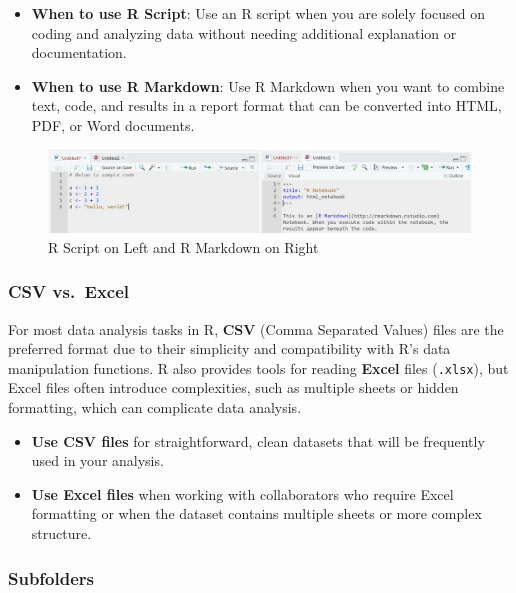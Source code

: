 \documentclass[
]{book}
\providecommand{\tightlist}{%
  \setlength{\itemsep}{0pt}\setlength{\parskip}{0pt}}
\begin{document}
\begin{itemize}
\tightlist
\item
  \textbf{When to use R Script}: Use an R script when you are solely focused on coding and analyzing data without needing additional explanation or documentation.
\item
  \textbf{When to use R Markdown}: Use R Markdown when you want to combine text, code, and results in a report format that can be converted into HTML, PDF, or Word documents.
\end{itemize}

\begin{figure}
\centering
\includegraphics[width=1\linewidth,height=\textheight,keepaspectratio]{images/script-md.jpg}
\caption{R Script on Left and R Markdown on Right}
\end{figure}

\subsubsection*{CSV vs.~Excel}\label{csv-vs.-excel}

For most data analysis tasks in R, \textbf{CSV} (Comma Separated Values) files are the preferred format due to their simplicity and compatibility with R's data manipulation functions. R also provides tools for reading \textbf{Excel} files (\texttt{.xlsx}), but Excel files often introduce complexities, such as multiple sheets or hidden formatting, which can complicate data analysis.

\begin{itemize}
\tightlist
\item
  \textbf{Use CSV files} for straightforward, clean datasets that will be frequently used in your analysis.
\item
  \textbf{Use Excel files} when working with collaborators who require Excel formatting or when the dataset contains multiple sheets or more complex structure.
\end{itemize}

\subsubsection*{Subfolders}\label{subfolders}
\end{document}
